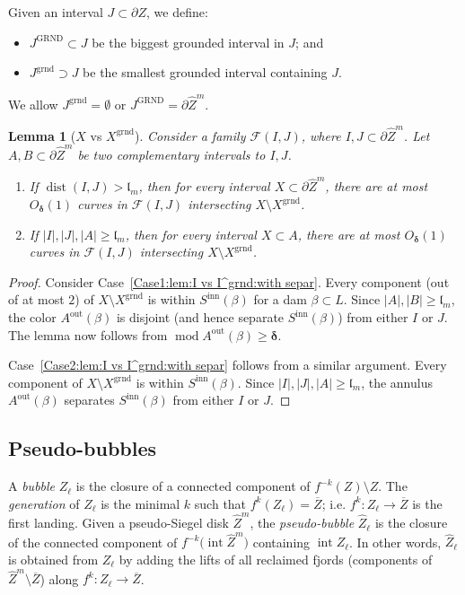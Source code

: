\documentclass{amsart}
\newcommand{\1}{{\mathbb 1 }}
\newcommand{\reminder}[1]{\textsl{$\lhd\rhd$#1$\lhd\rhd$}\marginpar{$\lhd\rhd\lhd\rhd\lhd\rhd$}}
\newcommand{\Fam}{{\mathcal F}}
\newcommand\intr{\operatorname{int}}
\newcommand{\wZ}{{\widehat Z}}
\newcommand{\length}{{\mathfrak l}}
\newcommand\inn{{\operatorname{inn}}}
\newcommand\out{{\operatorname{out}}}
\newcommand{\grnd}{{\operatorname{grnd}}}
\newcommand{\GRND}{{\operatorname{GRND}}}
\newtheorem{lem}[thm]{Lemma}
\theoremstyle{remark}
\numberwithin{equation}{section}
\theoremstyle{definition}
\newcommand{\dist}{\operatorname{dist}}
\renewcommand{\mod}{\operatorname{mod}}
\newcommand{\bdelta}{{\boldsymbol{ \delta}}}
\begin{document}
Given an interval $J\subset \partial Z$, we define:
\begin{itemize}
\item $J^\GRND\subset J$ be the biggest grounded interval in $J$; and
\item $J^\grnd\supset J$ be the smallest grounded interval containing $J$.
\end{itemize} 
We allow $J^\grnd =\emptyset$ or $J^\GRND = \partial \wZ^m$.


\begin{lem}[$X$ vs $X^\grnd$]
\label{lem:I vs I^grnd:with separ} Consider a family $\Fam(I,J)$, where $I,J\subset \partial \wZ^m$. Let $A,B\subset\partial \wZ^m$ be two complementary intervals to $I,J$. 
\begin{enumerate}[label=\text{(\roman*)},font=\normalfont,leftmargin=*]
\item \label{Case1:lem:I vs I^grnd:with separ}If $\dist(I,J)>\length_{m}$, then for every interval $X\subset \partial \wZ^m$, there are at most $O_\bdelta(1)$ curves in $\Fam(I,J)$ intersecting ${X\setminus X^\grnd}$. 
\item \label{Case2:lem:I vs I^grnd:with separ}If $|I|, |J|, |A|\ge \length_m$, then for every interval $X\subset A$, there are at most $O_\bdelta(1)$ curves in $\Fam(I,J)$ intersecting ${X\setminus X^\grnd}$. 
\end{enumerate}
\end{lem}
\begin{proof}
Consider Case~\ref{Case1:lem:I vs I^grnd:with separ}. Every component (out of at most $2$) of ${X\setminus X^\grnd}$ is within $ S^\inn(\beta)$ for a dam $\beta\subset L$. Since $|A|, |B|\ge \length_{m}$, the color $A^\out (\beta)$ is disjoint (and hence separate $S^\inn(\beta)$) from  either $I$ or $J$. The lemma now follows from $\mod A^\out (\beta)\ge \bdelta$.

Case~\ref{Case2:lem:I vs I^grnd:with separ} follows from a similar argument. Every component of ${X\setminus X^\grnd}$ is within $ S^\inn(\beta)$. Since $|I|, |J|, |A|\ge \length_m$, the annulus $A^\out (\beta)$ separates $S^\inn(\beta)$ from either $I$ or $J$.
\end{proof}

\subsection{Pseudo-bubbles}\label{ss:Ps-bubles}

 A \emph{bubble} $Z_\ell$ is the closure of a connected component of $f^{-k}(Z)\setminus Z$. The \emph{generation} of $Z_\ell$ is the minimal $k$ such that $f^k(Z_\ell)=\overline Z$; i.e. $f^k\colon Z_\ell\to \overline Z$ is the first landing. Given a pseudo-Siegel disk $\widehat Z^m$, the \emph{pseudo-bubble} $\widehat Z_\ell$ is the closure of the connected component of $f^{-k}\big( \intr \widehat Z^m\big)$ containing $\intr Z_\ell$. In other words, $\widehat Z_\ell$ is obtained from $Z_\ell$ by adding the lifts of all reclaimed fjords (components of $\widehat Z^m\setminus \overline Z$) along $f^k\colon Z_\ell\to \overline Z$.
\end{document}
